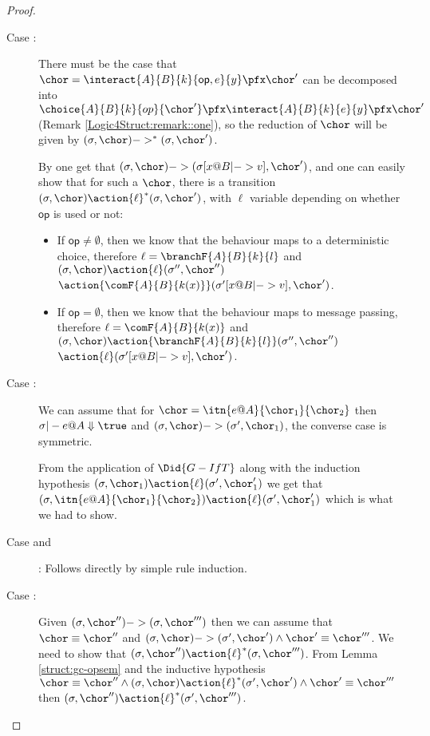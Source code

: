 \begin{proposition}
\begin{proof}
\begin{description}
\begin{description}
   \item[Case :] There must be the case that $\chor =
     \interact{A}{B}{k}{\mathsf{op}, e}{y} \pfx \chor'$ can be
     decomposed into $\choice{A}{B}{k}{op}{\chor'} \pfx
     \interact{A}{B}{k}{e}{y} \pfx \chor'$ (Remark \ref{Logic4Struct:remark::one}),
     so the reduction of $\chor$ will be given by $(\sigma, \chor) ->
     ^*(\sigma, \chor')$.

     By  one get that $(\sigma, \chor )->(\sigma [x@B |->
     v], \chor' )$, and one can easily show that for such a $\chor$,
     there is a transition $(\sigma, \chor) \action{\ell} ^* (\sigma,
     \chor')$, with $\ell$ variable depending on whether $\mathsf{op}$
     is used or not: 
     \begin{itemize}
       \item If $\mathsf{op} \not = \emptyset$, then we know that the behaviour
         maps to a deterministic choice, therefore $\ell =
         \branchF{A}{B}{k}{l}$ and $(\sigma,\chor)
         \action{\ell}(\sigma'', \chor'') $ $\action{\comF{A}{B}{k(x)}} (\sigma' [x@B |->
     v], \chor')$.
       \item If $\mathsf{op} = \emptyset$, then we know that the behaviour
         maps to message passing, therefore $\ell =
         \comF{A}{B}{k(x)}$ and $(\sigma,\chor)
         \action{\branchF{A}{B}{k}{l}}(\sigma'', \chor'') $ $\action{\ell} (\sigma' [x@B |->
     v], \chor')$.
      \end{itemize}
    \item[Case :] We can assume that for $\chor = \itn{
        e@A }{ \chor_1 }{ \chor_2 }$ then $\sigma |- e@A \Downarrow
      \true$ and $(\sigma,\chor) -> (\sigma',\chor_1)$, the converse
      case is symmetric.
      
        From the application of $\Did{G-IfT}$ along with the induction
        hypothesis $(\sigma,\chor_1)\action{\ell}(\sigma',\chor'_1)$
        we get that $ (\sigma,\itn{e@A}{\chor_1}{\chor_2}) \action{\ell}
        (\sigma',\chor'_1)$ which is what we had to show.
      
        
        
        \item[Case  and ]: Follows directly
          by simple rule induction.
          
        \item[Case :] Given $(\sigma, \chor'') ->
          (\sigma,\chor''')$ then we can assume that $\chor \equiv
          \chor''$ and $(\sigma,\chor) -> (\sigma',\chor') \land
          \chor' \equiv \chor'''$. We need to show that
          $(\sigma,\chor'') \action{\ell}^* (\sigma,\chor''')$. From
          Lemma \ref{struct:gc-opsem} and the inductive hypothesis
          $\chor \equiv \chor'' \land (\sigma,\chor)
          \action{\ell}^*(\sigma',\chor') \land \chor' \equiv \chor'''$
          then $(\sigma,\chor'') \action{\ell}^* (\sigma',\chor''')$.
 \end{description}



\end{description}
\end{proof}
\end{proposition}
